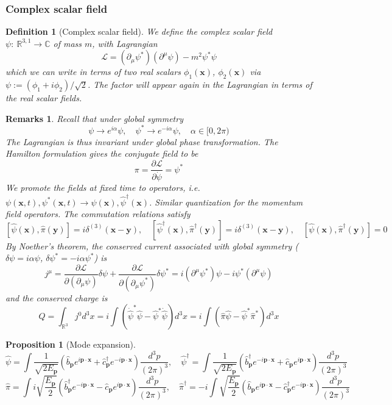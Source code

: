 \documentclass[a4paper]{article}
\newtheorem{remarks}{Remarks}[section]
\theoremstyle{new}
\newtheorem{defi}{Definition}[section]
\newtheorem{prop}{Proposition}[section]
\begin{document}
\subsubsection{Complex scalar field}
\begin{defi}[Complex scalar field]
We define the complex scalar field $\psi:~\mathbb{R}^{3,1}\rightarrow\mathbb{C}$ of mass $m$, with Lagrangian
$$\mathcal{L}=(\partial_\mu\psi^*)(\partial^\mu\psi)-m^2\psi^*\psi$$
which we can write in terms of two real scalars $\phi_1(\mathbf{x})$, $\phi_2(\mathbf{x})$ via $\psi:=(\phi_1+i\phi_2)/\sqrt{2}$. The factor will appear again in the Lagrangian in terms of the real scalar fields.
\end{defi}
\begin{remarks}
Recall that under global symmetry
$$\psi\rightarrow e^{i\alpha}\psi,\quad\psi^*\rightarrow e^{-i\alpha}\psi,\quad\alpha\in[0,2\pi)$$
The Lagrangian is thus invariant under global phase transformation. The Hamilton formulation gives the conjugate field to be
$$\pi=\frac{\partial\mathcal{L}}{\partial\dot{\psi}}=\psi^*$$
We promote the fields at fixed time to operators, i.e. $\psi(\mathbf{x},t),\psi^*(\mathbf{x},t)\rightarrow\hat{\psi}(\mathbf{x}),\hat{\psi}^\dag(\mathbf{x})$. Similar quantization for the momentum field operators. The commutation relations satisfy
$$[\hat{\psi}(\mathbf{x}),\hat{\pi}(\mathbf{y})]=i\delta^{(3)}(\mathbf{x}-\mathbf{y}),\quad[\hat{\psi}^\dag(\mathbf{x}),\hat{\pi}^\dag(\mathbf{y})]=i\delta^{(3)}(\mathbf{x}-\mathbf{y}),\quad[\hat{\psi}(\mathbf{x}),\hat{\pi}^\dag(\mathbf{y})]=0$$
By Noether's theorem, the conserved current associated with global symmetry ($\delta\psi=i\alpha\psi$, $\delta\psi^*=-i\alpha\psi^*$) is
$$j^\mu=\frac{\partial\mathcal{L}}{\partial(\partial_\mu\psi)}\delta\psi+\frac{\partial\mathcal{L}}{\partial(\partial_\mu\psi^*)}\delta\psi^*=i(\partial^\mu\psi^*)\psi-i\psi^*(\partial^\mu\psi)$$
and the conserved charge is
$$Q=\int_{\mathbb{R}^3}j^0d^3x=i\int(\dot{\hat{\psi}}^*\hat{\psi}-\hat{\psi}^*\dot{\hat{\psi}})d^3x=i\int(\hat{\pi}\hat{\psi}-\hat{\psi}^*\hat{\pi}^*)d^3x$$
\end{remarks}
\begin{prop}[Mode expansion]
$$\hat{\psi}=\int\frac{1}{\sqrt{2E_{\mathbf{p}}}}(\hat{b}_{\mathbf{p}}e^{i\mathbf{p}\cdot\mathbf{x}}+\hat{c}_{\mathbf{p}}^\dag e^{-i\mathbf{p}\cdot\mathbf{x}})\frac{d^3p}{(2\pi)^3},\quad\hat{\psi}^\dag=\int\frac{1}{\sqrt{2E_{\mathbf{p}}}}(\hat{b}^\dag_{\mathbf{p}}e^{-i\mathbf{p}\cdot\mathbf{x}}+\hat{c}_{\mathbf{p}} e^{i\mathbf{p}\cdot\mathbf{x}})\frac{d^3p}{(2\pi)^3}$$
$$\hat{\pi}=\int i\sqrt{\frac{E_{\mathbf{p}}}{2}}(\hat{b}_{\mathbf{p}}^\dag e^{-i\mathbf{p}\cdot\mathbf{x}}-\hat{c}_{\mathbf{p}}e^{i\mathbf{p}\cdot\mathbf{x}})\frac{d^3p}{(2\pi)^3},\quad\hat{\pi}^\dag=-i\int\sqrt{\frac{E_{\mathbf{p}}}{2}}(\hat{b}_{\mathbf{p}}e^{i\mathbf{p}\cdot\mathbf{x}}-\hat{c}_{\mathbf{p}}^\dag e^{-i\mathbf{p}\cdot\mathbf{x}})\frac{d^3p}{(2\pi)^3}$$
\end{prop}
\end{document}
